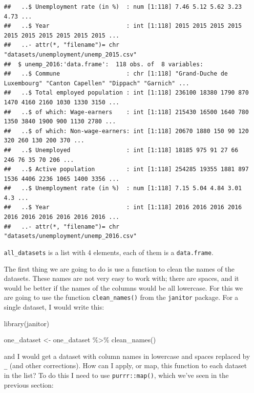 \documentclass[
]{article}
\newenvironment{Shaded}{\begin{snugshade}}{\end{snugshade}}
\newcommand{\FunctionTok}[1]{\textcolor[rgb]{0.00,0.00,0.00}{#1}}
\newcommand{\NormalTok}[1]{#1}
\newcommand{\OtherTok}[1]{\textcolor[rgb]{0.56,0.35,0.01}{#1}}
\newcommand{\SpecialCharTok}[1]{\textcolor[rgb]{0.00,0.00,0.00}{#1}}
\begin{document}
\begin{verbatim}
##   ..$ Unemployment rate (in %)  : num [1:118] 7.46 5.12 5.62 3.23 4.73 ...
##   ..$ Year                      : int [1:118] 2015 2015 2015 2015 2015 2015 2015 2015 2015 2015 ...
##   ..- attr(*, "filename")= chr "datasets/unemployment/unemp_2015.csv"
##  $ unemp_2016:'data.frame':  118 obs. of  8 variables:
##   ..$ Commune                   : chr [1:118] "Grand-Duche de Luxembourg" "Canton Capellen" "Dippach" "Garnich" ...
##   ..$ Total employed population : int [1:118] 236100 18380 1790 870 1470 4160 2160 1030 1330 3150 ...
##   ..$ of which: Wage-earners    : int [1:118] 215430 16500 1640 780 1350 3840 1900 900 1130 2780 ...
##   ..$ of which: Non-wage-earners: int [1:118] 20670 1880 150 90 120 320 260 130 200 370 ...
##   ..$ Unemployed                : int [1:118] 18185 975 91 27 66 246 76 35 70 206 ...
##   ..$ Active population         : int [1:118] 254285 19355 1881 897 1536 4406 2236 1065 1400 3356 ...
##   ..$ Unemployment rate (in %)  : num [1:118] 7.15 5.04 4.84 3.01 4.3 ...
##   ..$ Year                      : int [1:118] 2016 2016 2016 2016 2016 2016 2016 2016 2016 2016 ...
##   ..- attr(*, "filename")= chr "datasets/unemployment/unemp_2016.csv"
\end{verbatim}

\texttt{all\_datasets} is a list with 4 elements, each of them is a \texttt{data.frame}.

The first thing we are going to do is use a function to clean the names of the datasets. These
names are not very easy to work with; there are spaces, and it would be better if the names of the
columns would be all lowercase. For this we are going to use the function \texttt{clean\_names()} from the
\texttt{janitor} package. For a single dataset, I would write this:

\begin{Shaded}
\begin{Highlighting}[]
\FunctionTok{library}\NormalTok{(janitor)}

\NormalTok{one\_dataset }\OtherTok{\textless{}{-}}\NormalTok{ one\_dataset }\SpecialCharTok{\%\textgreater{}\%}
  \FunctionTok{clean\_names}\NormalTok{()}
\end{Highlighting}
\end{Shaded}

and I would get a dataset with column names in lowercase and spaces replaced by \texttt{\_} (and other
corrections). How can I apply, or map, this function to each dataset in the list? To do this I need
to use \texttt{purrr::map()}, which we've seen in the previous section:
\end{document}
